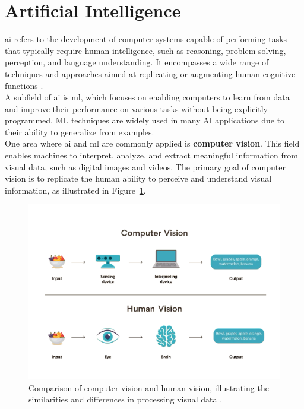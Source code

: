 \section{Artificial Intelligence} 
\label{sec:artificial-intelligence}

\gls{ai} refers to the development of computer systems capable of performing tasks that typically require human intelligence, such as reasoning, problem-solving, perception, and language understanding. It encompasses a wide range of techniques and approaches aimed at replicating or augmenting human cognitive functions \cite{ibm:ai}. \\

A subfield of \gls{ai} is \gls{ml}, which focuses on enabling computers to learn from data and improve their performance on various tasks without being explicitly programmed. ML techniques are widely used in many AI applications due to their ability to generalize from examples. \\

One area where \gls{ai} and \gls{ml} are commonly applied is \textbf{computer vision}. This field enables machines to interpret, analyze, and extract meaningful information from visual data, such as digital images and videos. The primary goal of computer vision is to replicate the human ability to perceive and understand visual information, as illustrated in Figure~\ref{fig:computer-vision}.

\begin{figure}[h!] \centering \includegraphics[width=0.75\linewidth]{figures/theory/machine-learning/computer-vision.png} \caption[Computer vision vs. human vision]{Comparison of computer vision and human vision, illustrating the similarities and differences in processing visual data \cite{turing:computer-vision}.} \label{fig:computer-vision} \end{figure}


